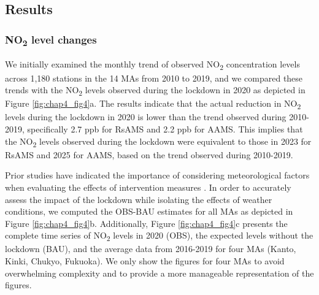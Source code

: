 \subsection{Results} \label{chap4_result}
\subsubsection{NO\textsubscript{2} level changes}
We initially examined the monthly trend of observed NO\textsubscript{2} concentration levels across 1,180 stations in the 14 MAs from 2010 to 2019, and we compared these trends with the NO\textsubscript{2} levels observed during the lockdown in 2020 as depicted in Figure \ref{fig:chap4_fig4}a. The results indicate that the actual reduction in NO\textsubscript{2} levels during the lockdown in 2020 is lower than the trend observed during 2010-2019, specifically 2.7 ppb for RsAMS and 2.2 ppb for AAMS. This implies that the NO\textsubscript{2} levels observed during the lockdown were equivalent to those in 2023 for RsAMS and 2025 for AAMS, based on the trend observed during 2010-2019. \par

Prior studies have indicated the importance of considering meteorological factors when evaluating the effects of intervention measures \citep{ordonez2020early,grange2021covid,shi2021abrupt}. In order to accurately assess the impact of the lockdown while isolating the effects of weather conditions, we computed the OBS-BAU estimates for all MAs as depicted in Figure \ref{fig:chap4_fig4}b. Additionally, Figure \ref{fig:chap4_fig4}c presents the complete time series of NO\textsubscript{2} levels in 2020 (OBS), the expected levels without the lockdown (BAU), and the average data from 2016-2019 for four MAs (Kanto, Kinki, Chukyo, Fukuoka). We only show the figures for four MAs to avoid overwhelming complexity and to provide a more manageable representation of the figures. \par

